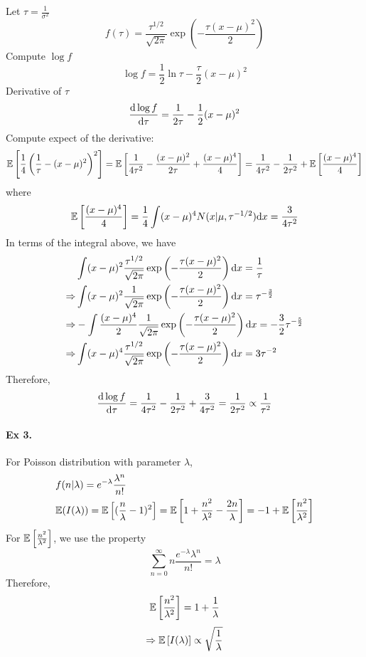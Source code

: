 	Let $\tau = \frac{1}{\sigma^2}$
	$$f(\tau) = \frac{\tau^{1/2}}{\sqrt{2\pi}}\exp\left(-\frac{\tau(x-\mu)^2}{2}\right)$$
	Compute $\log f$
	$$\log f = \frac{1}{2}\ln \tau - \frac{\tau}{2}(x-\mu)^2$$
	Derivative of $\tau$
	$$\frac{\mathrm{d} \log f}{\mathrm{d} \tau} = \frac{1}{2\tau} - \frac{1}{2}(x-\mu)^2$$
	Compute expect of the derivative:
	$$\mathbb{E}\left[\frac{1}{4}\left(\frac{1}{\tau}-(x-\mu)^2\right)^2\right]=\mathbb{E}\left[\frac{1}{4\tau^2}-\frac{(x-\mu)^2}{2\tau}+\frac{(x-\mu)^4}{4}\right] = \frac{1}{4\tau^2} - \frac{1}{2\tau^2}+\mathbb{E}\left[\frac{(x-\mu)^4}{4}\right]$$
	where
	$$\mathbb{E}\left[\frac{(x-\mu)^4}{4}\right] = \frac{1}{4}\int(x-\mu)^4N(x|\mu, \tau^{-1/2})\mathrm{d} x = \frac{3}{4\tau^2}$$
	In terms of the integral above, we have 
	\begin{align*}
		&\int(x-\mu)^2\frac{\tau^{1/2}}{\sqrt{2\pi}}\exp\left(-\frac{\tau(x-\mu)^2}{2}\right)\mathrm{d} x = \frac{1}{\tau}\\
		\Rightarrow&\int(x-\mu)^2\frac{1}{\sqrt{2\pi}}\exp\left(-\frac{\tau(x-\mu)^2}{2}\right)\mathrm{d} x = \tau^{-\frac{3}{2}}\\
		\Rightarrow&-\int\frac{(x-\mu)^4}{2}\frac{1}{\sqrt{2\pi}}\exp\left(-\frac{\tau(x-\mu)^2}{2}\right)\mathrm{d} x = -\frac{3}{2} \tau^{-\frac{5}{2}}\\
		\Rightarrow&\int(x-\mu)^4\frac{\tau^{1/2}}{\sqrt{2\pi}}\exp\left(-\frac{\tau(x-\mu)^2}{2}\right)\mathrm{d} x = 3 \tau^{-2}
	\end{align*}
	Therefore,
	$$\frac{\mathrm{d}\log f}{\mathrm{d}\tau}=\frac{1}{4\tau^2}-\frac{1}{2\tau^2}+\frac{3}{4\tau^2} = \frac{1}{2\tau^2}\propto \frac{1}{\tau^2}$$
	
	
	\paragraph{Ex 3.}
	For Poisson distribution with parameter $\lambda$,
	\begin{equation*}
		\begin{aligned}
			&f(n|\lambda) = e^{-\lambda} \frac{\lambda^n}{n!}\\
			&\mathbb{E} (I(\lambda)) = \mathbb{E}\left[(\frac{n}{\lambda}-1)^2\right] = \mathbb{E}\left[1+\frac{n^2}{\lambda^2}-\frac{2n}{\lambda}\right] = -1+\mathbb{E}\left[\frac{n^2}{\lambda^2}\right]
		\end{aligned}
	\end{equation*}
	For $\mathbb{E}\left[\frac{n^2}{\lambda^2}\right]$, we use the property
	$$\sum_{n=0}^{\infty}n \frac{e^{-\lambda}\lambda^n}{n!} = \lambda$$
	Therefore,
	$$\mathbb{E}\left[\frac{n^2}{\lambda^2}\right] = 1+\frac{1}{\lambda}$$
	$$\Rightarrow \mathbb{E}\left[I(\lambda)\right] \propto \sqrt{\frac{1}{\lambda}}$$
	

